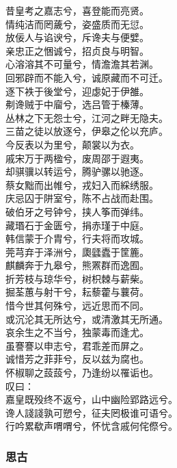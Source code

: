 \documentclass[]{article}
\begin{document}
昔皇考之嘉志兮，喜登能而亮贤。\\
情纯洁而罔薉兮，姿盛质而无愆。\\
放佞人与谄谀兮，斥谗夫与便嬖。\\
亲忠正之悃诚兮，招贞良与明智。\\
心溶溶其不可量兮，情澹澹其若渊。\\
回邪辟而不能入兮，诚原藏而不可迁。\\
逐下袟于後堂兮，迎虙妃于伊雒。\\
刜谗贼于中廇兮，选吕管于榛薄。\\
丛林之下无怨士兮，江河之畔无隐夫。\\
三苗之徒以放逐兮，伊皋之伦以充庐。\\
今反表以为里兮，颠裳以为衣。\\
戚宋万于两楹兮，废周邵于遐夷。\\
却骐骥以转运兮，腾驴骡以驰逐。\\
蔡女黜而出帷兮，戎妇入而綵绣服。\\
庆忌囚于阱室兮，陈不占战而赴围。\\
破伯牙之号钟兮，挟人筝而弹纬。\\
藏瑉石于金匮兮，捐赤瑾于中庭。\\
韩信蒙于介胄兮，行夫将而攻城。\\
莞芎弃于泽洲兮，瓟瓥蠹于筐簏。\\
麒麟奔于九皋兮，熊罴群而逸囿。\\
折芳枝与琼华兮，树枳棘与薪柴。\\
掘荃蕙与射干兮，耘藜藿与蘘荷。\\
惜今世其何殊兮，远近思而不同。\\
或沉沦其无所达兮，或清激其无所通。\\
哀余生之不当兮，独蒙毒而逢尤。\\
虽謇謇以申志兮，君乖差而屏之。\\
诚惜芳之菲菲兮，反以兹为腐也。\\
怀椒聊之蔎蔎兮，乃逢纷以罹诟也。\\
叹曰：\\
嘉皇既殁终不返兮，山中幽险郢路远兮。\\
谗人諓諓孰可愬兮，征夫罔极谁可语兮。\\
行吟累欷声喟喟兮，怀忧含戚何侘傺兮。

\hypertarget{header-n3117}{%
\subsubsection{思古}\label{header-n3117}}
\end{document}
